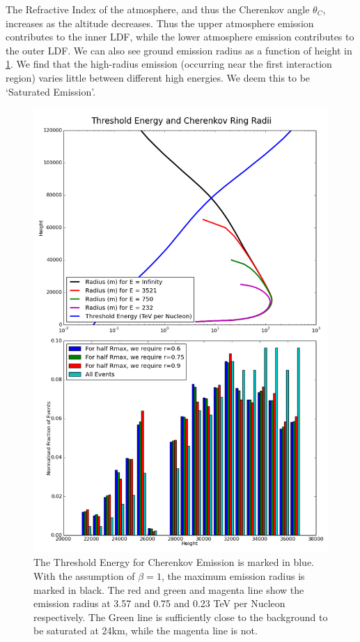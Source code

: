 \documentclass{article}
\begin{document}
The Refractive Index of the atmosphere, and thus the Cherenkov angle $\theta_{C}$, increases as the altitude decreases. Thus the upper atmosphere emission contributes to the inner LDF, while the lower atmosphere emission contributes to the outer LDF. We can also see ground emission radius as a function of height in \ref{fig:generalenergy}. We find that the high-radius emission (occurring near the first interaction region) varies little between different high energies. We deem this to be \textquoteleft Saturated Emission\textquoteright.

\begin{figure}
\begin{center}
\includegraphics[height=0.9\textheight]{logenergyradius}
\caption{The Threshold Energy for Cherenkov Emission is marked in blue. With the assumption of $\beta=1$, the maximum emission radius is marked in black. The red and green and magenta line show the emission radius at 3.57 and 0.75 and 0.23 TeV per Nucleon respectively. The Green line is sufficiently close to the background to be saturated at 24km, while the magenta line is not.}
\label{fig:generalenergy}
\end{center}
\end{figure}
\end{document}
